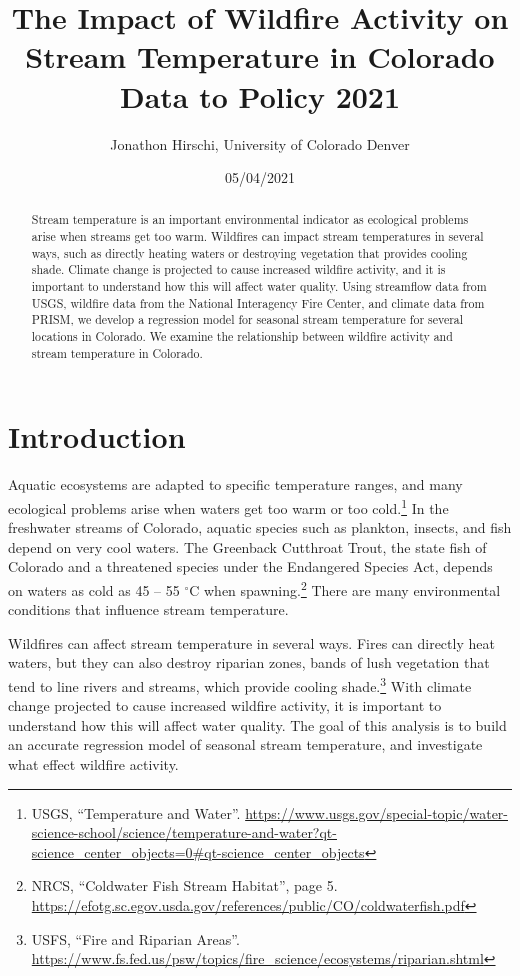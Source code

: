 \documentclass[
]{article}
\title{The Impact of Wildfire Activity on Stream Temperature in Colorado
Data to Policy 2021}
\author{Jonathon Hirschi, University of Colorado Denver}
\date{05/04/2021}
\begin{document}
\maketitle
\begin{abstract}
Stream temperature is an important environmental indicator as ecological
problems arise when streams get too warm. Wildfires can impact stream
temperatures in several ways, such as directly heating waters or
destroying vegetation that provides cooling shade. Climate change is
projected to cause increased wildfire activity, and it is important to
understand how this will affect water quality. Using streamflow data
from USGS, wildfire data from the National Interagency Fire Center, and
climate data from PRISM, we develop a regression model for seasonal
stream temperature for several locations in Colorado. We examine the
relationship between wildfire activity and stream temperature in
Colorado.
\end{abstract}

{
\setcounter{tocdepth}{2}
\tableofcontents
}
\hypertarget{introduction}{%
\section{Introduction}\label{introduction}}

Aquatic ecosystems are adapted to specific temperature ranges, and many
ecological problems arise when waters get too warm or too
cold.\footnote{USGS, ``Temperature and Water''.
  \url{https://www.usgs.gov/special-topic/water-science-school/science/temperature-and-water?qt-science_center_objects=0\#qt-science_center_objects}}
In the freshwater streams of Colorado, aquatic species such as plankton,
insects, and fish depend on very cool waters. The Greenback Cutthroat
Trout, the state fish of Colorado and a threatened species under the
Endangered Species Act, depends on waters as cold as 45 -- 55
\(^\circ\)C when spawning.\footnote{NRCS, ``Coldwater Fish Stream
  Habitat'', page 5.
  \url{https://efotg.sc.egov.usda.gov/references/public/CO/coldwaterfish.pdf}}
There are many environmental conditions that influence stream
temperature.

Wildfires can affect stream temperature in several ways. Fires can
directly heat waters, but they can also destroy riparian zones, bands of
lush vegetation that tend to line rivers and streams, which provide
cooling shade.\footnote{USFS, ``Fire and Riparian Areas''.
  \url{https://www.fs.fed.us/psw/topics/fire_science/ecosystems/riparian.shtml}}
With climate change projected to cause increased wildfire activity, it
is important to understand how this will affect water quality. The goal
of this analysis is to build an accurate regression model of seasonal
stream temperature, and investigate what effect wildfire activity.
\end{document}
